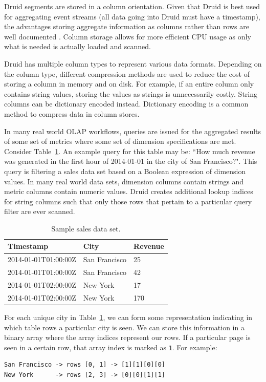 \documentclass{vldb}
\begin{document}
Druid segments are stored in a column orientation. Given that Druid is best
used for aggregating event streams (all data going into Druid must have a
timestamp), the advantages storing aggregate information as columns rather than
rows are well documented \cite{abadi2008column}. Column storage allows for more
efficient CPU usage as only what is needed is actually loaded and scanned. 

Druid has multiple column types to represent various data formats. Depending on
the column type, different compression methods are used to reduce the cost of
storing a column in memory and on disk. For example, if an entire column only
contains string values, storing the values as strings is unnecessarily costly.
String columns can be dictionary encoded instead. Dictionary encoding is a
common method to compress data in column stores.

In many real world OLAP workflows, queries are issued for the aggregated
results of some set of metrics where some set of dimension specifications are
met. Consider Table~\ref{tab:sample_data}. An example query for this table may
be: ``How much revenue was generated in the first hour of 2014-01-01 in the
city of San Francisco?". This query is filtering a sales data set based on a
Boolean expression of dimension values. In many real world data sets, dimension
columns contain strings and metric columns contain numeric values. Druid
creates additional lookup indices for string columns such that only those rows
that pertain to a particular query filter are ever scanned.

\begin{table}
  \centering
  \begin{tabular}{| l | l | l |}
    \hline
    \textbf{Timestamp} & \textbf{City} & \textbf{Revenue} \\ \hline
    2014-01-01T01:00:00Z & San Francisco & 25 \\ \hline
    2014-01-01T01:00:00Z & San Francisco & 42 \\ \hline
    2014-01-01T02:00:00Z & New York & 17 \\ \hline
    2014-01-01T02:00:00Z & New York & 170 \\ \hline
  \end{tabular}
  \caption{Sample sales data set.}
  \label{tab:sample_data}
\end{table}

For each unique city in
Table~\ref{tab:sample_data}, we can form some representation
indicating in which table rows a particular city is seen. We can
store this information in a binary array where the array indices
represent our rows. If a particular page is seen in a certain
row, that array index is marked as \texttt{1}. For example:
{\small\begin{verbatim}
San Francisco -> rows [0, 1] -> [1][1][0][0]
New York      -> rows [2, 3] -> [0][0][1][1]
\end{verbatim}}
\end{document}

